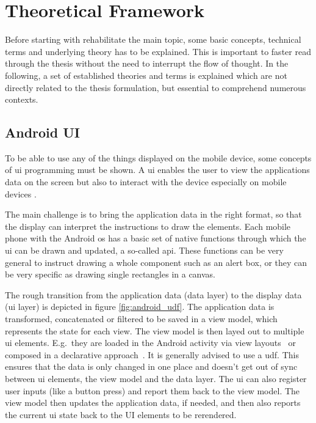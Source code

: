 \chapter{Theoretical Framework}
\label{ch:theoretical-framework}

Before starting with rehabilitate the main topic, some basic concepts, technical terms and underlying theory has to be explained.
This is important to faster read through the thesis without the need to interrupt the flow of thought.
In the following, a set of established theories and terms is explained which are not directly related to the thesis formulation, but essential to comprehend numerous contexts.

\section{Android UI}
\label{sec:android-ui}

To be able to use any of the things displayed on the mobile device, some concepts of \gls{ui} programming must be shown.
A \gls{ui} enables the user to view the applications data on the screen but also to interact with the device especially on mobile devices \cite{android_ui_layer}.

The main challenge is to bring the application data in the right format, so that the display can interpret the instructions to draw the elements.
Each mobile phone with the Android \gls{os} has a basic set of native functions through which the \gls{ui} can be drawn and updated, a so-called \gls{api}.
These functions can be very general to instruct drawing a whole component such as an alert box, or they can be very specific as drawing single rectangles in a canvas.

The rough transition from the application data (data layer) to the display data (ui layer) is depicted in figure \ref{fig:android_udf}.
The application data is transformed, concatenated or filtered to be saved in a view model, which represents the state for each view.
The view model is then layed out to multiple \gls{ui} elements.
E.g.\ they are loaded in the Android activity via view layouts~\cite{android_draw_views} or composed in a declarative approach~\cite{android_jetpack_compose}.
It is generally advised to use a \gls{udf}.
This ensures that the data is only changed in one place and doesn't get out of sync between \gls{ui} elements, the view model and the data layer.
The \gls{ui} can also register user inputs (like a button press) and report them back to the view model.
The view model then updates the application data, if needed, and then also reports the current \gls{ui} state back to the UI elements to be rerendered.

